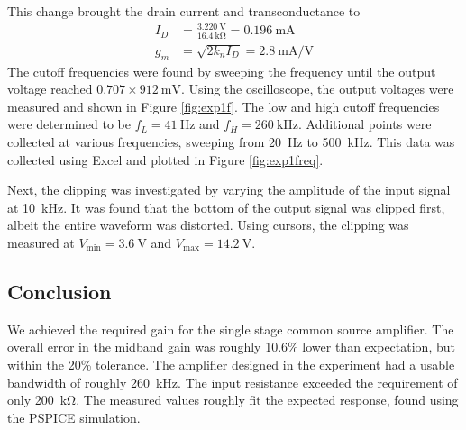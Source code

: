 \documentclass{report}
\begin{document}
This change brought the drain current and transconductance to \begin{align*}
	I_D & = \frac{\SI{3.220}{\V}}{\SI{16.4}{\kohm}} = \SI{0.196}{\mA} \\
	g_m & = \sqrt{2 k_n I_D} = \SI{2.8}{\mA/\V}
\end{align*}
The cutoff frequencies were found by sweeping the frequency until the output voltage reached $0.707 \times \SI{912}{\mV}$. Using the oscilloscope, the output voltages were measured and shown in Figure \ref{fig:exp1f}. The low and high cutoff frequencies were determined to be $f_L = \SI{41}{\Hz}$ and $f_H= \SI{260}{\kHz}$. Additional points were collected at various frequencies, sweeping from \SI{20}{\Hz} to \SI{500}{\kHz}. This data was collected using Excel and plotted in Figure \ref{fig:exp1freq}.

Next, the clipping was investigated by varying the amplitude of the input signal at \SI{10}{\kHz}. It was found that the bottom of the output signal was clipped first, albeit the entire waveform was distorted. Using cursors, the clipping was measured at $V_\mathrm{min} = \SI{3.6}{\V}$ and $V_\mathrm{max} = \SI{14.2}{\V}$.

\subsection{Conclusion}
We achieved the required gain for the single stage common source amplifier. The overall error in the midband gain was roughly 10.6\% lower than expectation, but within the 20\% tolerance. The amplifier designed in the experiment had a usable bandwidth of roughly \SI{260}{\kHz}. The input resistance exceeded the requirement of only \SI{200}{\kohm}. The measured values roughly fit the expected response, found using the PSPICE simulation.
\end{document}
